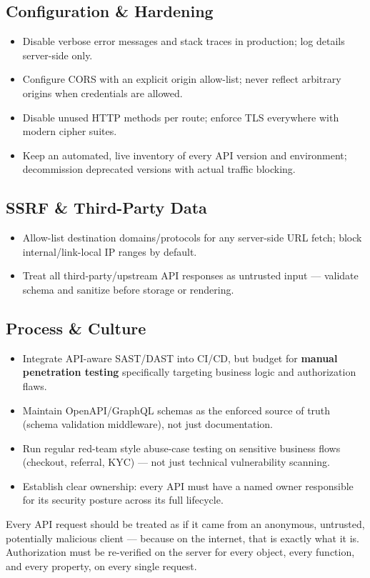 \documentclass[11pt]{article}
\begin{document}
\subsection{Configuration \& Hardening}
\begin{itemize}
  \item Disable verbose error messages and stack traces in production; log details server-side only.
  \item Configure CORS with an explicit origin allow-list; never reflect arbitrary origins when credentials are allowed.
  \item Disable unused HTTP methods per route; enforce TLS everywhere with modern cipher suites.
  \item Keep an automated, live inventory of every API version and environment; decommission deprecated versions with actual traffic blocking.
\end{itemize}

\subsection{SSRF \& Third-Party Data}
\begin{itemize}
  \item Allow-list destination domains/protocols for any server-side URL fetch; block internal/link-local IP ranges by default.
  \item Treat all third-party/upstream API responses as untrusted input --- validate schema and sanitize before storage or rendering.
\end{itemize}

\subsection{Process \& Culture}
\begin{itemize}
  \item Integrate API-aware SAST/DAST into CI/CD, but budget for \textbf{manual penetration testing} specifically targeting business logic and authorization flaws.
  \item Maintain OpenAPI/GraphQL schemas as the enforced source of truth (schema validation middleware), not just documentation.
  \item Run regular red-team style abuse-case testing on sensitive business flows (checkout, referral, KYC) --- not just technical vulnerability scanning.
  \item Establish clear ownership: every API must have a named owner responsible for its security posture across its full lifecycle.
\end{itemize}

\begin{notebox}
Every API request should be treated as if it came from an anonymous, untrusted, potentially malicious client --- because on the internet, that is exactly what it is. Authorization must be re-verified on the server for every object, every function, and every property, on every single request.
\end{notebox}
\end{document}
